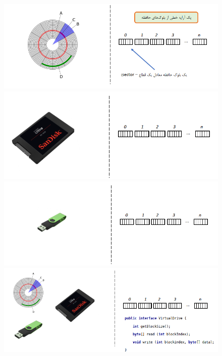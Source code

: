\begin{flushright}
    \begin{figure}[H]
        \includegraphics[width=\linewidth]{source/HDD-to-Drive}
        \label{fig:HDD-to-Drive}
        \endminipage\hfill
        \includegraphics[width=\linewidth]{source/SSD-to-Drive}
        \label{fig:SSD-to-Drive}
        \endminipage\hfill
        \includegraphics[width=\linewidth]{source/flash-to-Drive}
        \label{fig:flash-to-Drive}
        \endminipage\hfill
        \includegraphics[width=\linewidth]{source/all-to-Drive}
        \label{fig:all-to-Drive}
        \endminipage\hfill
    \end{figure}


\end{flushright}

